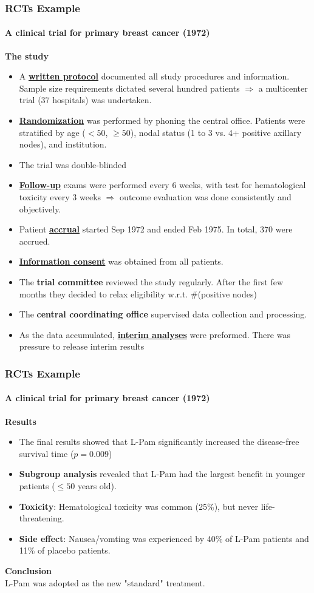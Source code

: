 \documentclass[table,10pt]{beamer}
\begin{document}
\begin{CJK*}{UTF8}{gbsn}
\begin{frame}[t]
\frametitle{RCTs Example}
\framesubtitle{A clinical trial for primary breast cancer (1972)}
\textbf{The study}
\begin{itemize}
\small
	\item A \underline{\bf written protocol} documented all study procedures and information. \alert{Sample size 
		requirements} dictated several hundred patients $\Rightarrow$ a \alert{multicenter} trial (37 hospitals) 
		was undertaken.
	\item \underline{\bf Randomization} was performed by phoning the central office. Patients were \alert{stratified} 
		by age ($<50$, $\ge 50$), nodal status (1 to 3 vs. 4+ positive axillary nodes), and institution.
	\item The trial was \alert{double-blinded}
	\item \underline{\bf Follow-up} exams were performed every 6 weeks, with test for hematological toxicity every 3 
		weeks $\Rightarrow$ outcome evaluation was done consistently and objectively.
	\item Patient \underline{\bf accrual} started Sep 1972 and ended Feb 1975. In total, 370 were accrued.
	\item \underline{\bf Information consent} was obtained from all patients.
	\item The \textbf{trial committee} reviewed the study regularly. After the first few months they decided 
		to relax eligibility w.r.t. \#(positive nodes)
	\item The \textbf{central coordinating office} supervised data collection and processing.
	\item As the data accumulated, \underline{\bf interim analyses} were preformed. There was pressure to release 
		interim results
\end{itemize}
\end{frame}

\begin{frame}[t]
\frametitle{RCTs Example}
\framesubtitle{A clinical trial for primary breast cancer (1972)}
\textbf{Results}
\begin{itemize}
	\item The final results showed that L-Pam significantly increased the disease-free 
		survival time ($p=0.009$)
	\item \textbf{Subgroup analysis} revealed that L-Pam had the largest benefit in 
		younger patients ($\le 50$ years old).
	\item \textbf{Toxicity}: Hematological toxicity was common (25\%), but never 
		life-threatening.
	\item \textbf{Side effect}: Nausea/vomting was experienced by 40\% of L-Pam patients 
		and 11\% of placebo patients.
\end{itemize}
\textbf{Conclusion}\\
L-Pam was adopted as the new "standard" treatment.
\end{frame}

\end{CJK*}
\end{document}
